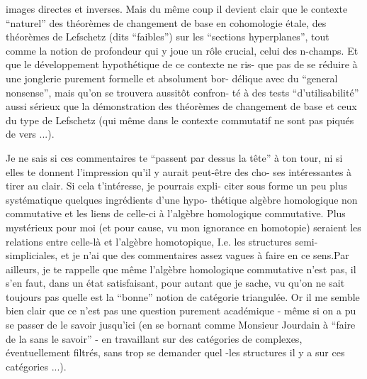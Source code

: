 
images directes et inverses. Mais du même coup il devient clair que le
contexte ``naturel'' des théorèmes de changement de base en cohomologie étale,
des théorèmes de Lefschetz (dits ``faibles'') sur les ``sections hyperplanes'',
tout comme  la notion de profondeur qui y joue un rôle crucial,   celui
des n-champs. Et que le développement hypothétique de ce contexte\deleted{,} ne ris-%
que pas de se réduire à une jonglerie purement formelle et absolument bor-%
délique avec du ``general nonsense'', mais qu'on se trouvera aussitôt confron-%
té à des tests ``d'utilisabilité'' aussi sérieux que la démonstration des
théorèmes de changement de base et ceux du type de Lefschetz (qui même
dans le contexte commutatif ne sont pas piqués de vers ...). 

Je ne sais si ces commentaires te ``passent par dessus la tête'' à ton
tour, ni si elles te donnent l'impression qu'il y aurait peut-être des cho-%
ses intéressantes à tirer au clair. Si cela t'intéresse, je pourrais expli-%
citer sous forme un peu plus systématique quelques ingrédients d'une hypo-%
thétique algèbre homologique non commutative et les liens de celle-ci à
l'algèbre homologique commutative. Plus mystérieux pour moi (et pour cause,
vu mon ignorance en homotopie) seraient les relations entre celle-là et
l'algèbre homotopique, I.e. les structures semi-simpliciales, et je n'ai
que des commentaires assez vagues à faire en ce sens\hand{(*)}.Par ailleurs, je te
rappelle que même l'algèbre homologique  commutative n'est pas, il s'en
faut, dans un état satisfaisant, pour autant que je sache, vu qu'on ne sait
 toujours pas quelle est la ``bonne'' notion de catégorie triangulée\hand{\unsure{(*)}}. Or il me
semble bien clair que ce n'est pas une question purement académique - même
si on a pu se passer de le savoir jusqu'ici (en se bornant comme Monsieur
Jourdain à ``faire de la  sans le savoir'' - en travaillant sur des
catégories de complexes, éventuellement filtrés, sans trop se demander quel
-les structures il y a sur ces catégories ...).

